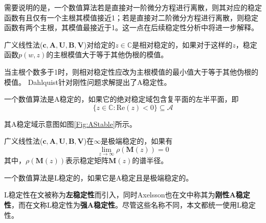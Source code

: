 需要说明的是，一个数值算法若是直接对一阶微分方程进行离散，则其对应的稳定函数有且仅有一个主根其模值接近1；若是直接对二阶微分方程进行离散，则稳定函数有两个主根，其模值最接近于1。这一点在后续稳定性分析中将进一步解释。
\begin{definition}[相对稳定性]
广义线性法($\bm{c},\bm{A},\bm{U},\bm{B},\bm{V}$)对给定的$z\in\mathbb{C}$是相对稳定的\cite{Gear1971a,袁新鼎1987}，如果对于这样的$z$，稳定函数$p(w,z)$的主根模值大于等于其他伪根的模值。
\end{definition}
当主根个数多于1时，则相对稳定性应改为主根模值的最小值大于等于其他伪根的模值。
Dahlquist针对刚性问题求解提出了A稳定性\cite{Dahlquist1963}。
\begin{definition}[A稳定性]
一个数值算法是A稳定的\cite{Dahlquist1963,Jackiewicz2009,ErnstHairer1996}，如果它的绝对稳定域包含复平面的左半平面，即
\begin{equation}
\{z\in\mathbb{C}:\text{Re}(z)<0\}\subseteq\mathcal{A}
\end{equation}
\end{definition}
其A稳定域示意图如图\ref{Fig:AStable}所示。
\begin{figure}[htpb]
\centering
{}
\end{figure}

\begin{definition}[极端稳定的]
广义线性法($\bm{c},\bm{A},\bm{U},\bm{B},\bm{V}$)在$\infty$是极端稳定的\cite{李寿佛2010}，如果有
\begin{equation}
\lim_{z\to\infty}\rho(\bm{M}(z))=0
\end{equation}
其中，$\rho(\bm{M}(z))$表示稳定矩阵$\bm{M}(z)$的谱半径。
\end{definition}
\begin{definition}[L稳定性]
一个数值算法是L稳定的\cite{Butcher2008,李寿佛2010,Jackiewicz2009}，如果它是A稳定且是极端稳定的。
\end{definition}
L稳定性在文被称为\textbf{左稳定性}而引入，同时Axelsson也在文中称其为\textbf{刚性A稳定性}，而在文称L稳定性为\textbf{强A稳定性}。尽管这些名称不同，本文都统一使用L稳定性。

